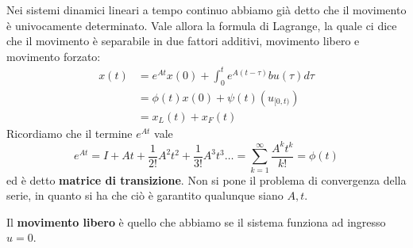 Nei sistemi dinamici lineari a tempo continuo abbiamo già detto che il movimento è univocamente determinato. Vale allora la formula di Lagrange, la quale ci dice che il movimento è separabile in due fattori additivi, movimento libero e movimento forzato:
\begin{equation}
	\boxed{
		\begin{aligned}
			{\displaystyle x(t)} & {\displaystyle =e^{At} x(0) +\int ^t_0 e^{A(t-\tau)} bu(\tau) d\tau } \\
			                     & =\phi (t) x(0) +\psi (t) \left(u_{[ 0,t)}\right)                                             \\
			                     & =x_L(t) +x_F(t)                                                                  
		\end{aligned}
	}
\end{equation}
Ricordiamo che il termine ${\displaystyle e^{At}}$ vale
\begin{equation*}
	{\displaystyle e^{At} =I+At+\frac{1}{2!} A^2 t^2 +\frac{1}{3!} A^3 t^3 \dotsc =\sum\limits ^{\infty }_{k=1}\frac{A^k t^k}{k!} =\phi (t)}
\end{equation*}
ed è detto \textbf{matrice di transizione}. Non si pone il problema di convergenza della serie, in quanto si ha che ciò è garantito qualunque siano $A,t$.

Il \textbf{movimento libero} è quello che abbiamo se il sistema funziona ad ingresso $u=0$.


